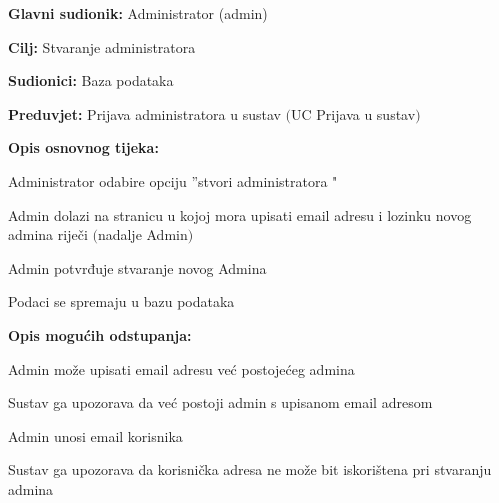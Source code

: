 \noindent {}
\begin{packed_item}

	\item \textbf{Glavni sudionik:} Administrator (admin)
	\item  \textbf{Cilj:} Stvaranje administratora
	\item  \textbf{Sudionici:} Baza podataka
	\item  \textbf{Preduvjet:} Prijava administratora u sustav $($UC Prijava u sustav$)$
	\item  \textbf{Opis osnovnog tijeka:}
	
	\item[] \begin{packed_enum}

		\item Administrator odabire opciju ”stvori administratora "
		\item Admin dolazi na stranicu u kojoj mora upisati email adresu i lozinku novog admina riječi $($nadalje Admin$)$
		\item Admin potvrđuje stvaranje novog Admina
		\item Podaci se spremaju u bazu podataka
	\end{packed_enum}
	
	\item  \textbf{Opis mogućih odstupanja:}
	
	\item[] \begin{packed_item}

		\item[2.a] Admin može upisati email adresu već postojećeg admina
		\item[] \begin{packed_enum}
			
			\item Sustav ga upozorava da već postoji admin s upisanom email adresom							
		\end{packed_enum}

		\item[2.b] Admin unosi email korisnika
		\item[] \begin{packed_enum}
			
			\item Sustav ga upozorava da korisnička adresa ne može bit iskorištena pri stvaranju admina								
		\end{packed_enum}
		
	\end{packed_item}
\end{packed_item}


